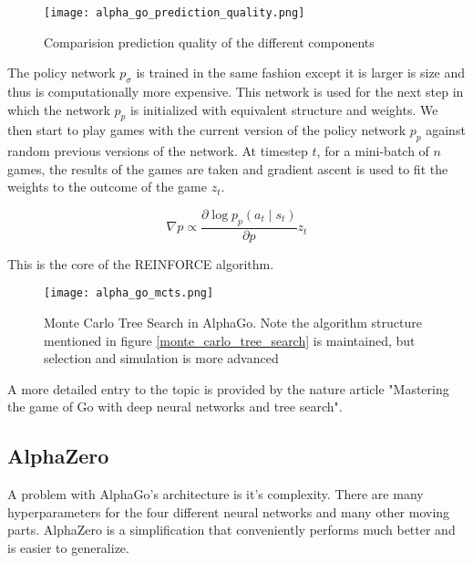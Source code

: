 \begin{figure}
    \centering
    \texttt{[image: alpha\_go\_prediction\_quality.png]}
    \caption{Comparision prediction quality of the different components \cite{silver_mastering_2016}}
    \label{alpha_go_prediction_quality}
\end{figure}

The policy network $p_{\sigma}$ is trained in the same fashion except it is larger is size and thus is computationally more expensive. This network is used for the next step in which the network $p_{p}$ is initialized with equivalent structure and weights. We then start to play games with the current version of the policy network $p_{p}$ against random previous versions of the network. At timestep $t$, for a mini-batch of $n$ games, the results of the games are taken and gradient ascent is used to fit the weights to the outcome of the game $z_t$.

$$
    \nabla p \propto \frac{\partial \log p_p(a_t \mid s_t)}{\partial p}z_t
$$

This is the core of the REINFORCE algorithm. \cite{williams_simple_nodate}
\begin{figure}
    \centering
    \texttt{[image: alpha\_go\_mcts.png]}
    \caption{Monte Carlo Tree Search in AlphaGo. \cite{silver_mastering_2016} Note the algorithm structure mentioned in figure \ref{monte_carlo_tree_search} is maintained, but selection and simulation is more advanced}
    \label{alpha_go_mcts}
\end{figure}

A more detailed entry to the topic is provided by the nature article "Mastering the game of Go with deep neural networks and tree search". \cite{silver_mastering_2016}

\subsection{AlphaZero}
A problem with AlphaGo's architecture is it's complexity. There are many hyperparameters for the four different neural networks and many other moving parts. AlphaZero is a simplification that conveniently performs much better and is easier to generalize.